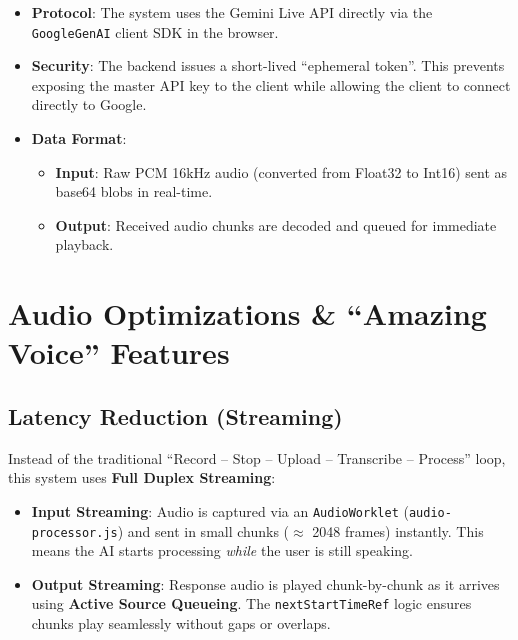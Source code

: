 \documentclass{article}
\begin{document}
\begin{itemize}
    \item \textbf{Protocol}: The system uses the Gemini Live API directly via the \texttt{GoogleGenAI} client SDK in the browser.
    \item \textbf{Security}: The backend issues a short-lived ``ephemeral token''. This prevents exposing the master API key to the client while allowing the client to connect directly to Google.
    \item \textbf{Data Format}:
    \begin{itemize}
        \item \textbf{Input}: Raw PCM 16kHz audio (converted from Float32 to Int16) sent as base64 blobs in real-time.
        \item \textbf{Output}: Received audio chunks are decoded and queued for immediate playback.
    \end{itemize}
\end{itemize}

\section{Audio Optimizations \& ``Amazing Voice'' Features}

\subsection{Latency Reduction (Streaming)}
Instead of the traditional ``Record -- Stop -- Upload -- Transcribe -- Process'' loop, this system uses \textbf{Full Duplex Streaming}:
\begin{itemize}
    \item \textbf{Input Streaming}: Audio is captured via an \texttt{AudioWorklet} (\texttt{audio-processor.js}) and sent in small chunks ($\approx$ 2048 frames) instantly. This means the AI starts processing \textit{while} the user is still speaking.
    \item \textbf{Output Streaming}: Response audio is played chunk-by-chunk as it arrives using \textbf{Active Source Queueing}. The \texttt{nextStartTimeRef} logic ensures chunks play seamlessly without gaps or overlaps.
\end{itemize}
\end{document}
